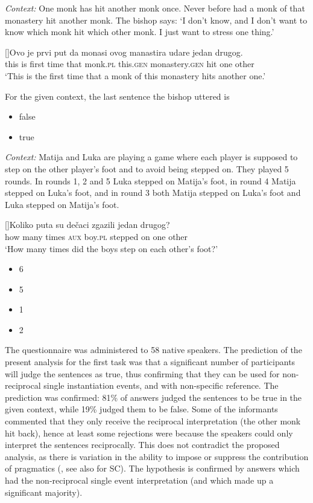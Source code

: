 \documentclass[output=paper,colorlinks,citecolor=brown]{langscibook}
\begin{document}
\eanoraggedright
\textit{Context:} One monk has hit another monk once. Never before had a monk of that monastery hit another monk. The bishop says: `I don't know, and I don't want to know which monk hit which other monk. I just want to stress one thing.'\medskip
\begin{xlist}
\exi{}[]{\gll Ovo je prvi put da monasi ovog manastira udare jedan drugog.\\
 this is first time that monk.\textsc{pl} this.\textsc{gen} monastery.\textsc{gen} hit one other\\
\glt `This is the first time that a monk of this monastery hits another one.'\medskip}
\end{xlist}
For the given context, the last sentence the bishop uttered is

\begin{itemize}
\item false
\item true
\end{itemize}\label{ex:arsenijevic:Context1}
 \z 

\eanoraggedright\label{ex:arsenijevic:Context2} \textit{Context:} Matija and Luka are playing a game where each player is supposed to step on the other player's foot and to avoid being stepped on. They played 5 rounds. In rounds 1, 2 and 5 Luka stepped on Matija's foot, in round 4 Matija stepped on Luka's foot, and in round 3 both Matija stepped on Luka's foot and Luka stepped on Matija's foot.\medskip

\begin{xlist}
\exi{}[]{\gll Koliko puta su dečaci zgazili jedan drugog?\\
 {how many} times \textsc{aux} boy.\textsc{pl} {stepped on} one other\\
\glt `How many times did the boys step on each other's foot?'}
\begin{itemize}
\item 6
\item 5
\item 1
\item 2
\end{itemize}
\end{xlist}
 \z

\noindent The questionnaire was administered to 58 native speakers. The prediction of the present analysis for the first task was that a significant number of participants will judge the sentences as true, thus confirming that they can be used for non-reciprocal single instantiation events, and with non-specific reference. The prediction was confirmed: 81\% of answers judged the sentences to be true in the given context, while 19\% judged them to be false. Some of the informants commented that they only receive the reciprocal interpretation (the other monk hit back), hence at least some rejections were because the speakers could only interpret the sentences reciprocally. This does not contradict the proposed analysis, as there is variation in the ability to impose or suppress the contribution of pragmatics (\citealt{i18}, see also \citealt{ma13} for SC). The hypothesis is confirmed by answers which had the non-reciprocal single event interpretation (and which made up a significant majority).
\end{document}
